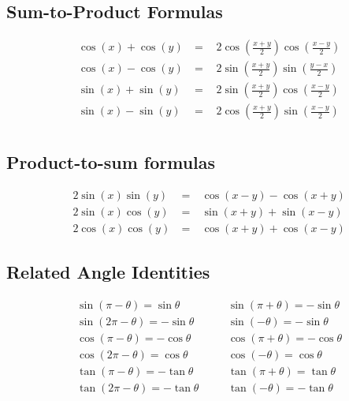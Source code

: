 \documentclass{article}
\begin{document}
\subsection*{Sum-to-Product Formulas}
  \begin{spreadlines}{1.3ex}
    \begin{alignat*}{3}
      &\cos(x) + \cos(y)\ &=\ &\, 2\cos(\tfrac{x + y}2)\cos(\tfrac{x - y}2) \\
      &\cos(x) - \cos(y)\ &=\ &\, 2\sin(\tfrac{x + y}2)\sin(\tfrac{y - x}2) \\
      &\sin(x) + \sin(y)\ &=\ &\, 2\sin(\tfrac{x + y}2)\cos(\tfrac{x - y}2) \\
      &\sin(x) - \sin(y)\ &=\ &\, 2\cos(\tfrac{x + y}2)\sin(\tfrac{x - y}2) \\
    \end{alignat*}
  \end{spreadlines}  
  \subsection*{Product-to-sum formulas}
    \begin{spreadlines}{1ex}
    \begin{alignat*}{3}
      &2\sin(x)\sin(y)\ &=\ & \cos(x-y)-\cos(x + y) \\
      &2\sin(x)\cos(y)\ &=\ & \sin(x + y) + \sin(x - y) \\
      &2\cos(x)\cos(y)\ &=\ & \cos(x + y) + \cos(x - y)
    \end{alignat*}
  \end{spreadlines}
\subsection*{Related Angle Identities}

\begin{align*}
&\sin (\pi - \theta) = \sin \theta \quad
&&\sin (\pi + \theta) = -\sin \theta \\
&\sin (2\pi - \theta) = -\sin \theta \quad
&&\sin (-\theta) = -\sin \theta \\
&\cos (\pi - \theta) = -\cos \theta \quad
&&\cos (\pi + \theta) = -\cos \theta \\
&\cos (2\pi - \theta) = \cos \theta \quad
&&\cos (-\theta) = \cos \theta \\
&\tan (\pi - \theta) = -\tan \theta \quad
&&\tan (\pi + \theta) = \tan \theta \\
&\tan (2\pi - \theta) = -\tan \theta \quad
&&\tan (-\theta) = -\tan \theta
\end{align*}
\end{document}

